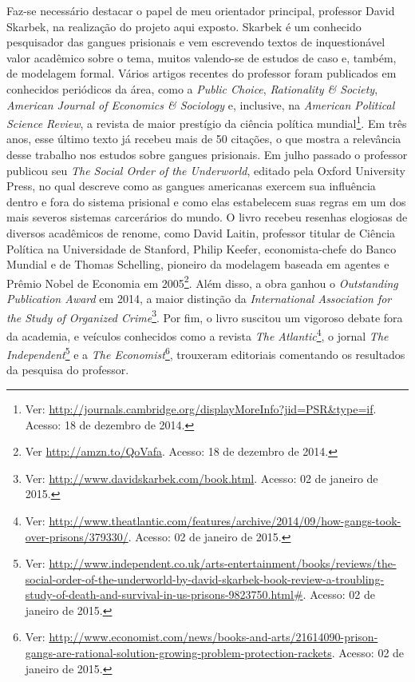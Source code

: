 \documentclass[a4paper,11pt]{article}
\begin{document}
Faz-se necessário destacar o papel de meu orientador principal, professor David Skarbek, na realização do projeto aqui exposto. Skarbek é um conhecido pesquisador das gangues prisionais e vem escrevendo textos de inquestionável valor acadêmico sobre o tema, muitos valendo-se de estudos de caso e, também, de modelagem formal. Vários artigos recentes do professor foram publicados em conhecidos periódicos da área, como a \textit{Public Choice}, \textit{Rationality \& Society}, \textit{American Journal of Economics \& Sociology} e, inclusive, na \textit{American Political Science Review}, a revista de maior prestígio da ciência política mundial\footnote{Ver: \href{http://journals.cambridge.org/action/displayMoreInfo?jid=PSR&type=if}{http://journals.cambridge.org/displayMoreInfo?jid=PSR\&type=if}. Acesso: 18 de dezembro de 2014.}. Em três anos, esse último texto já recebeu mais de 50 citações, o que mostra a relevância desse trabalho nos estudos sobre gangues prisionais. Em julho passado o professor publicou seu \textit{The Social Order of the Underworld}, editado pela Oxford University Press, no qual descreve como as gangues americanas exercem sua influência dentro e fora do sistema prisional e como elas estabelecem suas regras em um dos mais severos sistemas carcerários do mundo. O livro recebeu resenhas elogiosas de diversos acadêmicos de renome, como David Laitin, professor titular de Ciência Política na Universidade de Stanford, Philip Keefer, economista-chefe do Banco Mundial e de Thomas Schelling, pioneiro da modelagem baseada em agentes e Prêmio Nobel de Economia em 2005\footnote{Ver \href{http://amzn.to/QoVafa}{http://amzn.to/QoVafa}. Acesso: 18 de dezembro de 2014.}. Além disso, a obra ganhou o \textit{Outstanding Publication Award} em 2014, a maior distinção da \textit{International Association for the Study of Organized Crime}\footnote{Ver: \href{http://www.davidskarbek.com/book.html}{http://www.davidskarbek.com/book.html}. Acesso: 02 de janeiro de 2015.}. Por fim, o livro suscitou um vigoroso debate fora da academia, e veículos conhecidos como a revista \textit{The Atlantic}\footnote{Ver: \href{http://www.theatlantic.com/features/archive/2014/09/how-gangs-took-over-prisons/379330/}{http://www.theatlantic.com/features/archive/2014/09/how-gangs-took-over-prisons/379330/}. Acesso:  02 de janeiro de 2015.}, o jornal \textit{The Independent}\footnote{Ver: \href{http://www.independent.co.uk/arts-entertainment/books/reviews/the-social-order-of-the-underworld-by-david-skarbek-book-review-a-troubling-study-of-death-and-survival-in-us-prisons-9823750.html#}{http://www.independent.co.uk/arts-entertainment/books/reviews/the-social-order-of-the-underworld-by-david-skarbek-book-review-a-troubling-study-of-death-and-survival-in-us-prisons-9823750.html#}. Acesso:  02 de janeiro de 2015.} e a \textit{The Economist}\footnote{Ver: \href{http://www.economist.com/news/books-and-arts/21614090-prison-gangs-are-rational-solution-growing-problem-protection-rackets}{http://www.economist.com/news/books-and-arts/21614090-prison-gangs-are-rational-solution-growing-problem-protection-rackets}. Acesso:  02 de janeiro de 2015.}, trouxeram editoriais comentando os resultados da pesquisa do professor. 
\end{document}
